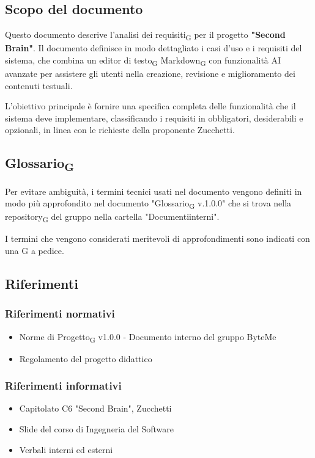 \documentclass[11pt,a4paper]{article}
\newcommand{\gls}[1]{#1\textsubscript{G}}
\begin{document}
\subsection{Scopo del documento}
Questo documento descrive l'\gls{analisi dei requisiti} per il progetto \textbf{"Second Brain"}. Il documento definisce in modo dettagliato i casi d'uso e i requisiti del sistema, che combina un \gls{editor di testo} \gls{Markdown} con funzionalità AI avanzate per assistere gli utenti nella creazione, revisione e miglioramento dei contenuti testuali.

L'obiettivo principale è fornire una specifica completa delle funzionalità che il sistema deve implementare, classificando i requisiti in obbligatori, desiderabili e opzionali, in linea con le richieste della proponente Zucchetti.

\subsection{\gls{Glossario}}
Per evitare ambiguità, i termini tecnici usati nel documento vengono definiti in modo più approfondito nel documento "\gls{Glossario} v.1.0.0" che si trova nella \gls{repository} del gruppo nella cartella "Documenti\textunderscore interni".

I termini che vengono considerati meritevoli di approfondimenti sono indicati con una G a pedice.

\subsection{Riferimenti}
\subsubsection{Riferimenti normativi}
\begin{itemize}
    \item \gls{Norme di Progetto} v1.0.0 - Documento interno del gruppo ByteMe
    \item Regolamento del progetto didattico
\end{itemize}

\subsubsection{Riferimenti informativi}
\begin{itemize}
    \item Capitolato C6 "Second Brain", Zucchetti
    \item Slide del corso di Ingegneria del Software
    \item Verbali interni ed esterni
\end{itemize}
\end{document}
